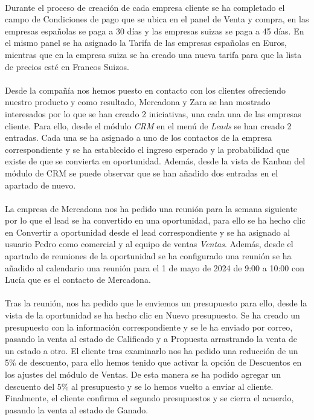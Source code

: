 \paragraph{}
Durante el proceso de creación de cada empresa cliente se ha completado el campo de Condiciones de pago que se ubica en el panel de Venta y compra, en las empresas españolas se paga a 30 días  y las empresas suizas se paga a 45 días. En el mismo panel se ha asignado la Tarifa de las empresas españolas en Euros, mientras que en la empresa suiza se ha creado una nueva tarifa para que la lista de precios esté en Francos Suizos.
\paragraph{}
Desde la compañía nos hemos puesto en contacto con los clientes ofreciendo nuestro producto y como resultado, Mercadona y Zara se han mostrado interesados por lo que se han creado 2 iniciativas, una cada una de las empresas cliente. Para ello, desde el módulo \textit{CRM} en el menú de \textit{Leads} se han creado 2 entradas. Cada una se ha asignado a uno de los contactos de la empresa correspondiente y se ha establecido el ingreso esperado y la probabilidad que existe de que se convierta en oportunidad.
Además, desde la vista de Kanban del módulo de CRM se puede observar que se han añadido dos entradas en el apartado de nuevo.
\paragraph{}
La empresa de Mercadona nos ha pedido una reunión para la semana siguiente por lo que el lead se ha convertido en una oportunidad, para ello se ha hecho clic en Convertir a oportunidad desde el lead correspondiente y se ha asignado al usuario Pedro como comercial y al equipo de ventas \textit{Ventas}. Además, desde el apartado de reuniones de la oportunidad se ha configurado una reunión se ha añadido al calendario una reunión para el 1 de mayo de 2024 de 9:00 a 10:00 con Lucía que es el contacto de Mercadona.
\paragraph{}
Tras la reunión, nos ha pedido que le enviemos un presupuesto para ello, desde la vista de la oportunidad se ha hecho clic en Nuevo presupuesto. Se ha creado un presupuesto con la información correspondiente y se le ha enviado por correo, pasando la venta al estado de Calificado y a Propuesta arrastrando la venta de un estado a otro. El cliente tras examinarlo nos ha pedido una reducción de un 5\% de descuento, para ello hemos tenido que activar la opción de Descuentos en los ajustes del módulo de Ventas. De esta manera se ha podido agregar un descuento del 5\% al presupuesto y se lo hemos vuelto a enviar al cliente. Finalmente, el cliente confirma el segundo presupuestos y se cierra el acuerdo, pasando la venta al estado de Ganado.
\newpage
